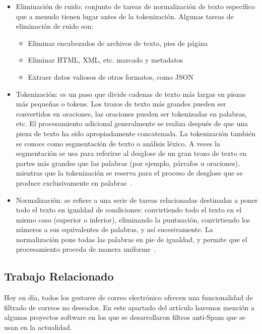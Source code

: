 \documentclass[conference,a4paper]{IEEEtran}
\begin{document}
\begin{itemize}
\item Eliminación de ruido: conjunto de tareas de normalización de texto específico que a menudo tienen lugar antes de la tokenización. Algunas tareas de eliminación de ruido son:
\begin{itemize}
\item Eliminar encabezados de archivos de texto, pies de página
\item Eliminar HTML, XML, etc. marcado y metadatos
\item Extraer datos valiosos de otros formatos, como JSON 
~\cite{b8}
\end{itemize} 

\item Tokenización: es un paso que divide cadenas de texto más largas en piezas más pequeñas o tokens. Los trozos de texto más grandes pueden ser convertidos en oraciones, las oraciones pueden ser tokenizadas en palabras, etc. El procesamiento adicional generalmente se realiza después de que una pieza de texto ha sido apropiadamente concatenada. La tokenización también se conoce como segmentación de texto o análisis léxico. A veces la segmentación se usa para referirse al desglose de un gran trozo de texto en partes más grandes que las palabras (por ejemplo, párrafos u oraciones), mientras que la tokenización se reserva para el proceso de desglose que se produce exclusivamente en palabras~\cite{b9}.

\item Normalización: se refiere a una serie de tareas relacionadas destinadas a poner todo el texto en igualdad de condiciones: convirtiendo todo el texto en el mismo caso (superior o inferior), eliminando la puntuación, convirtiendo los números a sus equivalentes de palabras, y así sucesivamente. La normalización pone todas las palabras en pie de igualdad, y permite que el procesamiento proceda de manera uniforme~\cite{b10}.
\end{itemize}                                                         
                                                           
\newpage                                                           


\subsection{Trabajo Relacionado}




Hoy en día, todos los gestores de correo electrónico ofrecen una funcionalidad de filtrado de correos no deseados. En este apartado del artículo haremos mención a algunos proyectos software en los que se desarrollaron filtros anti-Spam que se usan en la actualidad.
\end{document}
